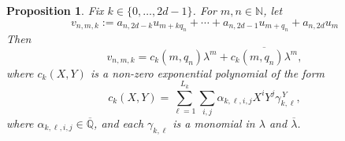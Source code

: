 \documentclass[10pt,a4paper]{amsart}
\newtheorem{proposition}{Proposition}
\begin{document}
\begin{proposition}
\label{prop:non-vanish3}
Fix $k\in\{0,\ldots,2d-1\}$. For $m,n\in\mathbb{N}$, let
\begin{equation}
    v_{n,m,k}
    :={a}_{n,2d-k}u_{m+kq_n}
       +\cdots
       +{a}_{n,2d-1}u_{m+q_n}
       +{a}_{n,2d}u_m
    \label{eq:def-vnmk}
\end{equation}
Then
\begin{equation}
    v_{n,m,k}
    =c_k(m,q_n)\lambda^m
     +\overline{c_k(m,q_n)\lambda^m},
    \label{eq:v-c-form}
\end{equation}
where $c_k(X,Y)$ is a non-zero exponential polynomial of the form
\begin{equation}
    c_k(X,Y)
    =\sum_{\ell=1}^{L_k}\sum_{i,j}
       \alpha_{k,\ell,i,j}X^iY^j\gamma_{k,\ell}^{\,Y},
    \label{eq:ck-exp-polynomial}
\end{equation}
where 
$\alpha_{k,\ell,i,j} \in \overline{\mathbb{Q}}$, and each
$\gamma_{k,\ell}$ is a monomial in $\lambda$ and $\overline{\lambda}$.
\end{proposition}
\end{document}
